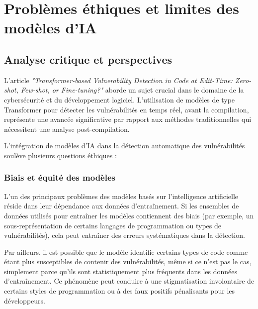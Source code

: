 \chapter{Problèmes éthiques et limites des modèles d’IA}



\section{Analyse critique et perspectives}



L'article \textit{"Transformer-based
Vulnerability Detection in Code at Edit-Time: Zero-shot, Few-shot, or
Fine-tuning?"} aborde un sujet crucial dans le domaine de la
cybersécurité et du développement logiciel. L'utilisation de modèles de type
Transformer pour détecter les vulnérabilités en temps réel, avant la
compilation, représente une avancée significative par rapport aux méthodes
traditionnelles qui nécessitent une analyse post-compilation.






L’intégration
de modèles d’IA dans la détection automatique des vulnérabilités soulève
plusieurs questions éthiques :



\subsection{Biais et équité des modèles}



L'un des
principaux problèmes des modèles basés sur l’intelligence artificielle réside
dans leur dépendance aux données d’entraînement. Si les ensembles de données
utilisés pour entraîner les modèles contiennent des biais (par exemple, un
sous-représentation de certains langages de programmation ou types de
vulnérabilités), cela peut entraîner des erreurs systématiques dans la
détection.



Par
ailleurs, il est possible que le modèle identifie certains types de code comme
étant plus susceptibles de contenir des vulnérabilités, même si ce n’est pas le
cas, simplement parce qu’ils sont statistiquement plus fréquents dans les
données d'entraînement. Ce phénomène peut conduire à une stigmatisation
involontaire de certains styles de programmation ou à des faux positifs
pénalisants pour les développeurs.




